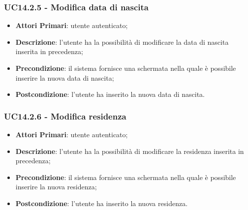 \subsubsection{UC14.2.5 - Modifica data di nascita}
\begin{itemize}
	\item \textbf{Attori Primari}: utente autenticato;
	\item \textbf{Descrizione}: l'utente ha la possibilità di modificare la data di nascita inserita in precedenza;
	\item \textbf{Precondizione}: il sistema fornisce una schermata nella quale è possibile inserire la nuova data di nascita;
	\item \textbf{Postcondizione}: l'utente ha inserito la nuova data di nascita.
\end{itemize}
\subsubsection{UC14.2.6 - Modifica residenza}
\begin{itemize}
	\item \textbf{Attori Primari}: utente autenticato;
	\item \textbf{Descrizione}: l'utente ha la possibilità di modificare la residenza inserita in precedenza;
	\item \textbf{Precondizione}: il sistema fornisce una schermata nella quale è possibile inserire la nuova residenza;
	\item \textbf{Postcondizione}: l'utente ha inserito la nuova residenza.
\end{itemize}
